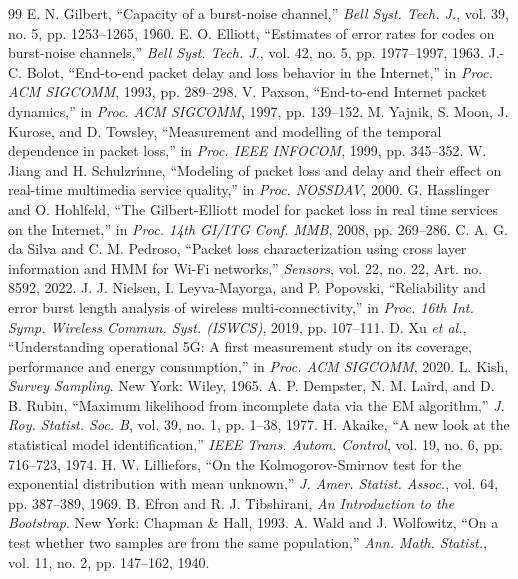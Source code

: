 \documentclass[conference]{IEEEtran}
\begin{document}
\begin{thebibliography}{99}
 E. N. Gilbert, ``Capacity of a burst-noise channel,'' \emph{Bell Syst. Tech. J.}, vol. 39, no. 5, pp. 1253--1265, 1960.
 E. O. Elliott, ``Estimates of error rates for codes on burst-noise channels,'' \emph{Bell Syst. Tech. J.}, vol. 42, no. 5, pp. 1977--1997, 1963.
 J.-C. Bolot, ``End-to-end packet delay and loss behavior in the Internet,'' in \emph{Proc. ACM SIGCOMM}, 1993, pp. 289--298.
 V. Paxson, ``End-to-end Internet packet dynamics,'' in \emph{Proc. ACM SIGCOMM}, 1997, pp. 139--152.
 M. Yajnik, S. Moon, J. Kurose, and D. Towsley, ``Measurement and modelling of the temporal dependence in packet loss,'' in \emph{Proc. IEEE INFOCOM}, 1999, pp. 345--352.
 W. Jiang and H. Schulzrinne, ``Modeling of packet loss and delay and their effect on real-time multimedia service quality,'' in \emph{Proc. NOSSDAV}, 2000.
 G. Hasslinger and O. Hohlfeld, ``The Gilbert-Elliott model for packet loss in real time services on the Internet,'' in \emph{Proc. 14th GI/ITG Conf. MMB}, 2008, pp. 269--286.
 C. A. G. da Silva and C. M. Pedroso, ``Packet loss characterization using cross layer information and HMM for Wi-Fi networks,'' \emph{Sensors}, vol. 22, no. 22, Art. no. 8592, 2022.
 J. J. Nielsen, I. Leyva-Mayorga, and P. Popovski, ``Reliability and error burst length analysis of wireless multi-connectivity,'' in \emph{Proc. 16th Int. Symp. Wireless Commun. Syst. (ISWCS)}, 2019, pp. 107--111.
 D. Xu \emph{et al.}, ``Understanding operational 5G: A first measurement study on its coverage, performance and energy consumption,'' in \emph{Proc. ACM SIGCOMM}, 2020.
 L. Kish, \emph{Survey Sampling}. New York: Wiley, 1965.
 A. P. Dempster, N. M. Laird, and D. B. Rubin, ``Maximum likelihood from incomplete data via the EM algorithm,'' \emph{J. Roy. Statist. Soc. B}, vol. 39, no. 1, pp. 1--38, 1977.
 H. Akaike, ``A new look at the statistical model identification,'' \emph{IEEE Trans. Autom. Control}, vol. 19, no. 6, pp. 716--723, 1974.
 H. W. Lilliefors, ``On the Kolmogorov-Smirnov test for the exponential distribution with mean unknown,'' \emph{J. Amer. Statist. Assoc.}, vol. 64, pp. 387--389, 1969.
 B. Efron and R. J. Tibshirani, \emph{An Introduction to the Bootstrap}. New York: Chapman \& Hall, 1993.
 A. Wald and J. Wolfowitz, ``On a test whether two samples are from the same population,'' \emph{Ann. Math. Statist.}, vol. 11, no. 2, pp. 147--162, 1940.

\end{thebibliography}
\end{document}
